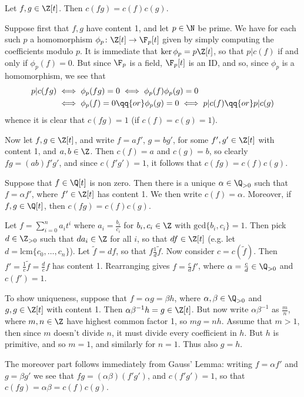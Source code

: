 \documentclass{maths}
\begin{document}
\begin{lem}
    Let $f,g\in\Z[t]$.
    Then $c(fg)=c(f)c(g)$.
\end{lem}

\begin{prf}
    Suppose first that $f,g$ have content 1, and let $p\in\N$ be prime.
    We have for each such $p$ a homomorphism $\phi_p\colon\Z[t]\to\F_p[t]$ given by simply computing the coefficients modulo $p$.
    It is immediate that $\ker{\phi_p}=p\Z[t]$, so that $p|c(f)$ if and only if $\phi_p(f)=0$.
    But since $\F_p$ is a field, $\F_p[t]$ is an ID, and so, since $\phi_p$ is a homomorphism, we see that
    \begin{align*}
        p|c(fg)
        &\iff
        \phi_p(fg)=0
        \iff
        \phi_p(f)\phi_p(g)=0\\
        &\iff
        \phi_p(f)=0\qq{or}\phi_p(g)=0
        \iff
        p|c(f)\qq{or}p|c(g)
    \end{align*}
    whence it is clear that $c(fg)=1$ (if $c(f)=c(g)=1$).

    Now let $f,g\in\Z[t]$, and write $f=af'$, $g=bg'$, for some $f',g'\in\Z[t]$ with content 1, and $a,b\in\Z$.
    Then $c(f)=a$ and $c(g)=b$, so clearly $fg=(ab)f'g'$, and since $c(f'g')=1$, it follows that $c(fg)=c(f)c(g)$.
\end{prf}

\begin{lem}
    Suppose that $f\in\Q[t]$ is non zero.
    Then there is a unique $\alpha\in\Q_{>0}$ such that $f=\alpha f'$, where $f'\in\Z[t]$ has content 1.
    We then write $c(f)=\alpha$.
    Moreover, if $f,g\in\Q[t]$, then $c(fg)=c(f)c(g)$.
\end{lem}

\begin{prf}
    Let $f=\sum_{i=0}^n a_i t^i$ where $a_i=\frac{b_i}{c_i}$ for $b_i,c_i\in\Z$ with $\mathrm{gcd}\{b_i,c_i\}=1$.
    Then pick $d\in\Z_{>0}$ such that $da_i\in\Z$ for all $i$, so that $df\in\Z[t]$ (e.g. let $d=\mathrm{lcm}\{c_0,\ldots,c_n\}$).
    Let $\tilde{f}=df$, so that $f\frac{1}{d}\tilde{f}$.
    Now consider $c=c(\tilde{f})$.
    Then $f'=\frac{1}{c}\tilde{f}=\frac{d}{c}f$ has content 1.
    Rearranging gives $f=\frac{c}{d}f'$, where $\alpha=\frac{c}{d}\in\Q_{>0}$ and $c(f')=1$.

    To show uniqueness, suppose that $f=\alpha g=\beta h$, where $\alpha,\beta\in\Q_{>0}$ and $g,g\in\Z[t]$ with content 1.
    Then $\alpha\beta^{-1}h=g\in\Z[t]$.
    But now write $\alpha\beta^{-1}$ as $\frac{m}{n}$, where $m,n\in\Z$ have highest common factor 1, so $mg=nh$.
    Assume that $m>1$, then since $m$ doesn't divide $n$, it must divide every coefficient in $h$.
    But $h$ is primitive, and so $m=1$, and similarly for $n=1$.
    Thus also $g=h$.

    The moreover part follows immediately from Gauss' Lemma: writing $f=\alpha f'$ and $g=\beta g'$ we see that $fg=(\alpha\beta)(f'g')$, and $c(f'g')=1$, so that $c(fg)=\alpha\beta=c(f)c(g)$.
\end{prf}
\end{document}
